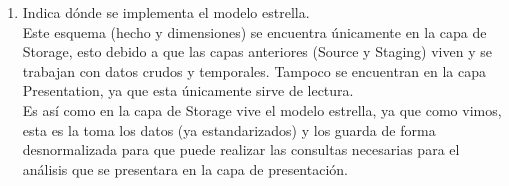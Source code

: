 \begin{enumerate}
        \item Indica dónde se implementa el modelo estrella. \\
        Este esquema (hecho y dimensiones) se encuentra únicamente en la capa de Storage, esto debido a que las capas anteriores (Source y Staging) viven y se trabajan con datos crudos y temporales. Tampoco se encuentran en la capa Presentation, ya que esta únicamente sirve de lectura. \\
        Es así como en la capa de Storage vive el modelo estrella, ya que como vimos, esta es la toma los datos (ya estandarizados) y los guarda de forma desnormalizada para que puede realizar las consultas necesarias para el análisis que se presentara en la capa de presentación.

    \end{enumerate}